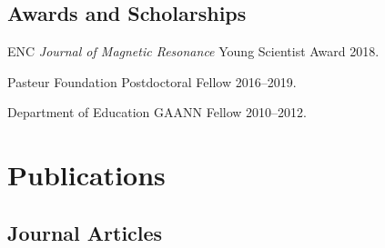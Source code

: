 \documentclass[letterpaper]{article}
\renewenvironment{itemize}{
  \begin{list}{}{
    \setlength{\leftmargin}{1.5em}
  }
}{
  \end{list}
}
\begin{document}
\subsection*{Awards and Scholarships}

\begin{itemize}
 \item ENC {\it Journal of Magnetic Resonance}
  Young Scientist Award \hfill 2018.
 \item Pasteur Foundation Postdoctoral Fellow \hfill 2016--2019.
 \item Department of Education GAANN Fellow \hfill 2010--2012.
\end{itemize}


\section*{Publications}

\subsection*{Journal Articles}




\end{document}
